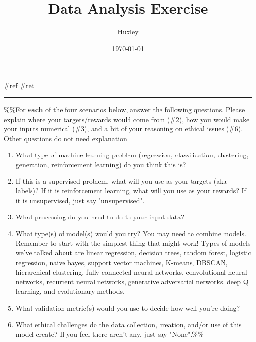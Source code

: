\documentclass[letterpaper]{article}
\author{Huxley}
\date{\today}
\title{Data Analysis Exercise}
\renewcommand\maketitle{}
\begin{document}
\maketitle
\#ref \#ret

\noindent\rule{\textwidth}{0.5pt}

\%\%For \textbf{each} of the four scenarios below, answer the following
questions. Please explain where your targets/rewards would come from
(\#2), how you would make your inputs numerical (\#3), and a bit of your
reasoning on ethical issues (\#6). Other questions do not need
explanation.

\begin{enumerate}
\item What type of machine learning problem (regression, classification,
clustering, generation, reinforcement learning) do you think this is?
\item If this is a supervised problem, what will you use as your targets
(aka labels)? If it is reinforcement learning, what will you use as
your rewards? If it is unsupervised, just say "unsupervised".
\item What processing do you need to do to your input data?
\item What type(s) of model(s) would you try? You may need to combine
models. Remember to start with the simplest thing that might work!
Types of models we've talked about are linear regression, decision
trees, random forest, logistic regression, naive bayes, support
vector machines, K-means, DBSCAN, hierarchical clustering, fully
connected neural networks, convolutional neural networks, recurrent
neural networks, generative adversarial networks, deep Q learning,
and evolutionary methods.
\item What validation metric(s) would you use to decide how well you're
doing?
\item What ethical challenges do the data collection, creation, and/or use
of this model create? If you feel there aren't any, just say
"None".\%\%
\end{enumerate}
\end{document}
